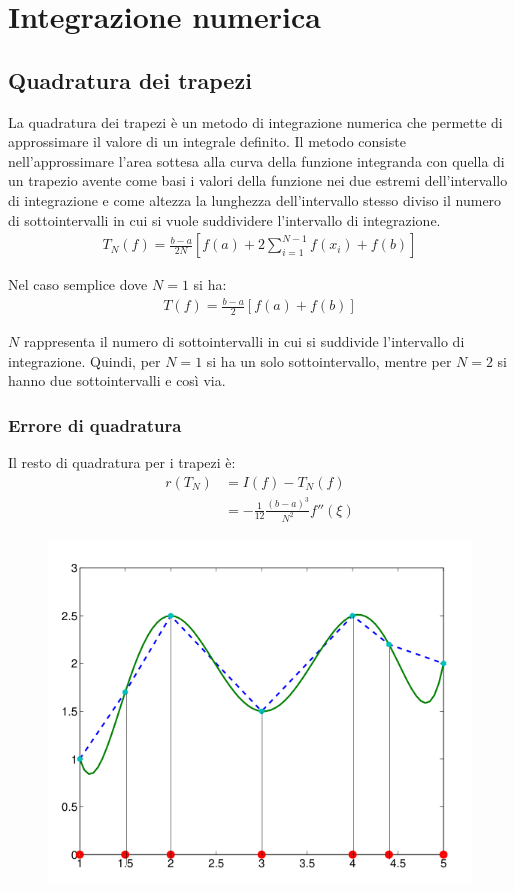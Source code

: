 \chapter{Integrazione numerica}
\section{Quadratura dei trapezi}
La quadratura dei trapezi è un metodo di integrazione numerica che permette di approssimare il valore di un integrale definito. Il metodo consiste nell'approssimare l'area sottesa alla curva della funzione integranda con quella di un trapezio avente come basi i valori della funzione nei due estremi dell'intervallo di integrazione e come altezza la lunghezza dell'intervallo stesso diviso il numero di sottointervalli in cui si vuole suddividere l'intervallo di integrazione.
\begin{align}
  T_N(f) = \frac{b - a}{2 N} [ f(a) + 2 \sum_{i=1}^{N-1} f(x_i) + f(b) ]
\end{align}

Nel caso semplice dove $N = 1$ si ha:
\begin{align}
  T(f) = \frac{b - a}{2} [ f(a) + f(b) ]
\end{align}

$N$ rappresenta il numero di sottointervalli in cui si suddivide l'intervallo di integrazione. Quindi, per $N = 1$ si ha un solo sottointervallo, mentre per $N = 2$ si hanno due sottointervalli e così via.



\subsection{Errore di quadratura}
Il resto di quadratura per i trapezi è:
\begin{align}
  r(T_N) &= I(f) - T_N(f) \\
  &= - \frac{1}{12} \frac{(b - a)^3}{N^2} f''(\xi)
\end{align}


\begin{figure}[h!]
  \centering
  \includegraphics[width=0.4\linewidth]{./images/trapezi}
\end{figure}


